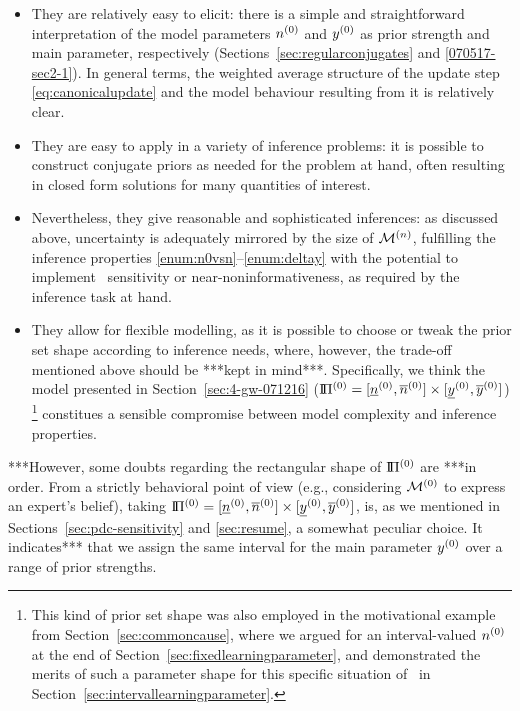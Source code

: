 \begin{itemize}
\item They are relatively easy to elicit:
there is a simple and straightforward interpretation of the model parameters $n^{(0)}$ and $y^{(0)}$
as prior strength and main parameter, respectively (Sections~\ref{sec:regularconjugates} and \ref{070517-sec2-1}).
In general terms, the weighted average structure of the update step \eqref{eq:canonicalupdate}
and the model behaviour resulting from it is relatively clear.
\item They are easy to apply in a variety of inference problems:
it is possible to construct conjugate priors as needed for the problem at hand,
often resulting in closed form solutions for many quantities of interest.
\item Nevertheless, they give reasonable and sophisticated inferences:
as discussed above, uncertainty is adequately mirrored by the size of $\mathcal{M}^{(n)}$,
fulfilling the inference properties \ref{enum:n0vsn}--\ref{enum:deltay}
with the potential to implement \pdc\ sensitivity or near-noninformativeness,
as required by the inference task at hand.
\item They allow for flexible modelling, as
it is possible to choose or tweak the prior set shape according to inference needs,
where, however, the trade-off mentioned above should be ***kept in mind***.
Specifically, we think the model presented in Section~\ref{sec:4-gw-071216}
($\text{I}\!\Pi^{(0)} = [\underline{n}^{(0)}, \overline{n}^{(0)}] \times [\underline{y}^{(0)}, \overline{y}^{(0)}]$)%
\footnote{This kind of prior set shape was also employed in the motivational example
from Section~\ref{sec:commoncause}, where we argued for an interval-valued $n^{(0)}$
at the end of Section~\ref{sec:fixedlearningparameter},
and demonstrated the merits of such a parameter shape for this specific situation of \pdc\
in Section~\ref{sec:intervallearningparameter}.}
constitues a sensible compromise between model complexity and inference properties.
\end{itemize}

***However, some doubts regarding the rectangular shape of $\text{I}\!\Pi^{(0)}$ are ***in order.
From a strictly behavioral point of view
(e.g., considering $\mathcal{M}^{(0)}$ to express an expert's belief),
taking $\text{I}\!\Pi^{(0)} = [\underline{n}^{(0)}, \overline{n}^{(0)}] \times [\underline{y}^{(0)}, \overline{y}^{(0)}]$,
is, as we mentioned in Sections~\ref{sec:pdc-sensitivity} and \ref{sec:resume}, a somewhat peculiar choice.
It indicates*** that we assign the same interval for the main parameter $y^{(0)}$
over a range of prior strengths.

